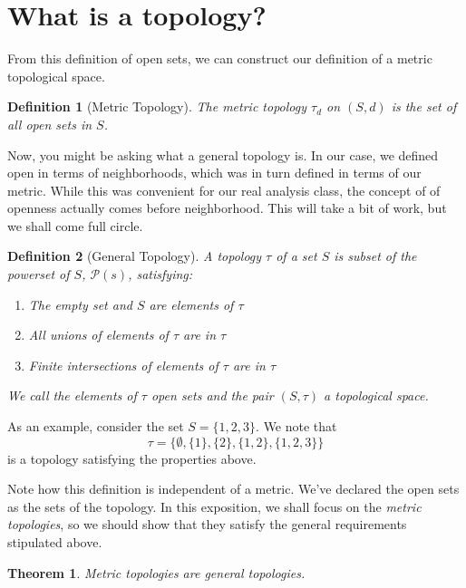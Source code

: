 \documentclass{article}
\newtheorem*{thm}{Theorem}
\newtheorem*{defn}{Definition}
\begin{document}
\section{What is a topology?}

From this definition of open sets, we can construct our definition of a
metric topological space.

\begin{defn}[Metric Topology]
The metric topology $\tau_d$ on $(S, d)$ is the set of all open sets in $S$.
\end{defn}

Now, you might be asking what a general topology is. In our case, we defined
open in terms of neighborhoods, which was in turn defined in terms of our
metric. While this was convenient for our real analysis class, the concept of
of openness actually comes before neighborhood. This will take a bit of work,
but we shall come full circle.

\begin{defn}[General Topology]
A topology $\tau$ of a set $S$ is subset of the powerset of $S$,
$\mathcal{P}(s)$, satisfying:
\begin{enumerate}
\item The empty set and $S$ are elements of $\tau$
\item All unions of elements of $\tau$ are in $\tau$
\item Finite intersections of elements of $\tau$ are in $\tau$
\end{enumerate}
We call the elements of $\tau$ open sets and the pair $(S, \tau)$ a topological
space.
\end{defn}

As an example, consider the set $S = \{1, 2, 3\}$. We note that $$\tau =
\{\emptyset, \{1\}, \{2\}, \{1, 2\}, \{1, 2, 3\}\}$$ is a topology satisfying the
properties above.

Note how this definition is independent of a metric. We've declared the open
sets as the sets of the topology. In this exposition, we shall focus on the
\textit{metric topologies}, so we should show that they satisfy the general
requirements stipulated above.

\begin{thm}
    Metric topologies are general topologies.
\end{thm}
\end{document}
